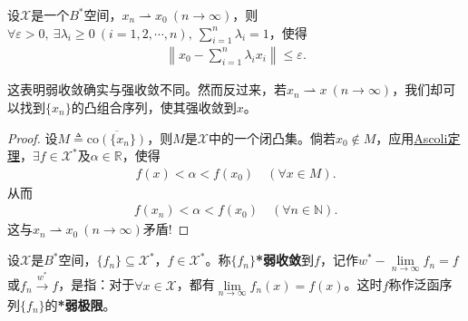 \documentclass[../../main.tex]{subfiles}%
\begin{document}
\begin{theorem}[Mazur定理]
设$\mathscr{X}$是一个$B^*$空间，$x_n\rightharpoonup x_0\ (n\to\infty)$，则$\forall\varepsilon>0,\ \exists\lambda_i\geqslant0\ (i=1,2,\cdots,n),\ \sum\limits_{i=1}^{n}\lambda_i=1$，使得
\begin{align*}
\left\|x_0-\sum\limits_{i=1}^{n}\lambda_ix_i\right\|\leqslant\varepsilon.
\end{align*}
\end{theorem}
\begin{remark}
这表明弱收敛确实与强收敛不同。然而反过来，若$x_n\rightharpoonup x\ (n\to\infty)$，我们却可以找到$\{x_n\}$的凸组合序列，使其强收敛到$x$。
\end{remark}
\begin{proof}
设$M\triangleq\overline{\mathrm{co}(\{x_n\})}$，则$M$是$\mathscr{X}$中的一个闭凸集。倘若$x_0\notin M$，应用\hyperref[corollary:泛函分析--Ascoli定理]{Ascoli定理}，$\exists f\in\mathscr{X}^*$及$\alpha\in\mathbb{R}$，使得
\begin{align*}
f(x)<\alpha<f(x_0)\quad(\forall x\in M).
\end{align*}
从而
\begin{align*}
f(x_n)<\alpha<f(x_0)\quad(\forall n\in\mathbb{N}).
\end{align*}
这与$x_n\rightharpoonup x_0\ (n\to\infty)$矛盾!
\end{proof}

\begin{definition}
设$\mathscr{X}$是$B^*$空间，$\{f_n\}\subseteq\mathscr{X}^*$，$f\in\mathscr{X}^*$。称$\{f_n\}$\textbf{*弱收敛}到$f$，记作$w^*-\lim\limits_{n\to\infty}f_n=f$或$f_n \xrightarrow{w^*} f$，是指：对于$\forall x\in\mathscr{X}$，都有$\lim\limits_{n\to\infty}f_n(x)=f(x)$。这时$f$称作泛函序列$\{f_n\}$的\textbf{*弱极限}。
\end{definition}
\end{document}
